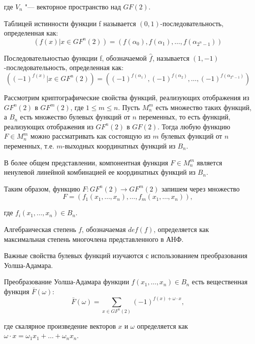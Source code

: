где $V_n$ "--- векторное пространство над $GF(2)$.

Таблицей истинности функции f называется $(0,1)$-последовательность,
определенная как:
\begin{equation}(f(x) | x \in GF^n(2)) = (f(\alpha_0), f(\alpha_1), \ldots,
f(\alpha_{2^n - 1}))\end{equation}

Последовательностью функции f, обозначаемой $\hat{f}$, называется
$(1,-1)$-последовательность, определенная как:
\begin{equation}((-1)^{f(x)}| x \in GF^n(2)) = ((-1)^{f(\alpha_1)},
(-1)^{f(\alpha_2)}, \ldots, (-1)^{f(\alpha_{2^n - 1})})\end{equation}

Рассмотрим криптографические свойства функций, реализующих отображения из
$GF^n(2)$ в $GF^m(2)$, где $1 \leq m \leq n$. Пусть $M^m_n$ есть множество таких
функций, а $B_n$ есть множество булевых функций от $n$ переменных, то есть
функций, реализующих отображения из $GF^n(2)$ в $GF(2)$. Тогда любую функцию $F
\in M^m_n$ можно рассматривать как состоящую из $m$ булевых функций от $n$
переменных, т.е. $m$-выходных координатных функций из $B_n$.

В более общем представлении, компонентная функция $F \in M^m_n$ является
ненулевой линейной комбинацией ее координатных функций из $B_n$.

Таким образом, функцию $F: GF^n(2) \rightarrow GF^m(2)$ запишем через множество
\begin{equation}F = (f_1(x_1, \ldots, x_n), \ldots, f_m(x_1, \ldots,
x_n)),\end{equation}

где $f_i(x_1, \ldots, x_n) \in B_n$.

Алгебраическая степень $f$, обозначаемая $def(f)$, определяется как максимальная
степень многочлена представленного в АНФ.

Важные свойства булевых функций изучаются с использованием преобразования
Уолша-Адамара.

Преобразование Уолша-Адамара функции $f(x_1, \ldots, x_n) \in B_n$ есть
вещественная функция $\bar{F}(\omega)$:
\begin{equation}\bar{F}(\omega) = \sum_{x \in GF^n(2)}{(-1)^{f(x) + \omega \cdot
x}},\end{equation}

где скалярное произведение векторов $x$ и $\omega$ определяется как $\omega
\cdot x = \omega_1 x_1 + \ldots + \omega_n x_n$.


